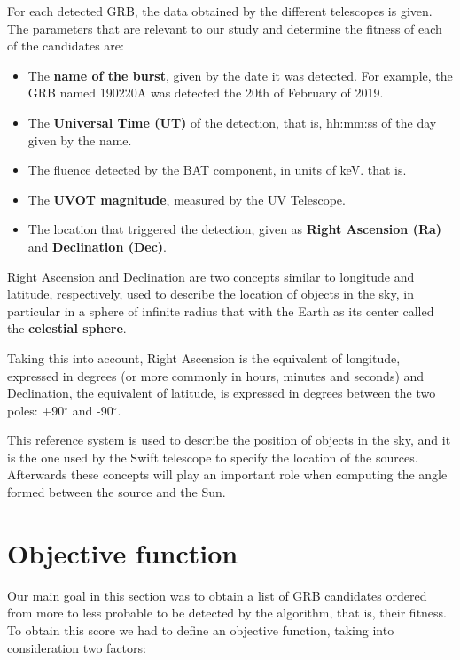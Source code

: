 For each detected GRB, the data obtained by the different telescopes is given. The parameters that are relevant to our study and determine the fitness of each of the candidates are:

\begin{itemize}
\item The \textbf{name of the burst}, given by the date it was detected. For example, the GRB named 190220A was detected the 20th of February of 2019.
\item The \textbf{Universal Time (UT)} of the detection, that is, hh:mm:ss of the day given by the name.
\item The fluence detected by the BAT component, in units of keV. that is.
\item The \textbf{UVOT magnitude}, measured by the UV Telescope.
\item The location that triggered the detection, given as  \textbf{Right Ascension (Ra)} and \textbf{Declination (Dec)}.
\end{itemize}

Right Ascension and Declination are two concepts similar to longitude and latitude, respectively, used to describe the location of objects in the sky, in particular in a sphere of infinite radius that with the Earth as its center called the \textbf{celestial sphere}.

Taking this into account, Right Ascension is the equivalent of longitude, expressed in degrees (or more commonly in hours, minutes and seconds) and Declination, the equivalent of latitude, is expressed in degrees between the two poles: +90$^{\circ}$ and -90$^{\circ}$. \cite{nasareferencesystem}

This reference system is used to describe the position of objects in the sky, and it is the one used by the Swift telescope to specify the location of the sources. Afterwards these concepts will play an important role when computing the angle formed between the source and the Sun.

\section{Objective function}

Our main goal in this section was to obtain a list of GRB candidates ordered from more to less probable to be detected by the algorithm, that is, their fitness. To obtain this score we had to define an objective function, taking into consideration two factors:


